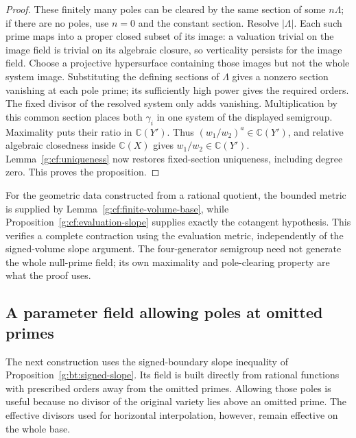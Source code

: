 \begin{proof}
These finitely many poles can be cleared by the same section of some
$n\Lambda$; if there are no poles, use $n=0$ and the constant section. Resolve $|\Lambda|$. Each such prime maps into a proper
closed subset of its image: a valuation trivial on the image field is
trivial on its algebraic closure, so verticality persists for the image
field. Choose a projective hypersurface containing those images but not
the whole system image. Substituting the defining sections of $\Lambda$
gives a nonzero section vanishing at each pole prime; its sufficiently
high power gives the required orders. The fixed divisor of the resolved
system only adds vanishing. Multiplication by this common section places
both $\gamma_i$ in one system of the displayed semigroup. Maximality
puts their ratio in $\mathbb C(Y')$. Thus
$(w_1/w_2)^a\in\mathbb C(Y')$, and relative algebraic closedness inside
$\mathbb C(X)$ gives $w_1/w_2\in\mathbb C(Y')$.
Lemma~\ref{g:cf:uniqueness} now restores fixed-section uniqueness,
including degree zero. This proves the proposition.
\end{proof}

For the geometric data constructed from a rational quotient, the bounded
metric is supplied by Lemma~\ref{g:cf:finite-volume-base}, while
Proposition~\ref{g:cf:evaluation-slope} supplies exactly the cotangent
hypothesis. This verifies a complete contraction using the evaluation
metric, independently of the signed-volume slope argument. The four-generator
semigroup need not generate the whole null-prime field; its own
maximality and pole-clearing property are what the proof uses.

\subsection{A parameter field allowing poles at omitted primes}
\label{g:cf:parameter-subsection}

The next construction uses the signed-boundary slope inequality
of Proposition~\ref{g:bt:signed-slope}.  Its field is built directly
from rational functions with prescribed orders away from the
omitted primes.  Allowing those poles is useful because no divisor
of the original variety lies above an omitted prime.  The
effective divisors used for horizontal interpolation, however,
remain effective on the whole base.

